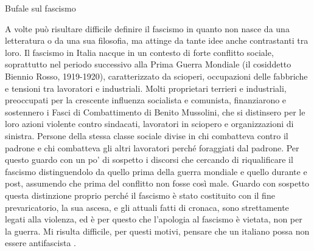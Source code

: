 \documentclass[12pt]{book} %
\begin{document}
\begin{mdframed}[linewidth=1pt]
Bufale sul fascismo

A volte può risultare difficile definire il fascismo in quanto non nasce da una letteratura o da una sua filosofia, ma attinge da tante idee anche contrastanti tra loro. 
Il fascismo in Italia nacque in un contesto di forte conflitto sociale, soprattutto nel periodo successivo alla Prima Guerra Mondiale (il cosiddetto Biennio Rosso, 1919-1920), caratterizzato da scioperi, occupazioni delle fabbriche e tensioni tra lavoratori e industriali.
Molti proprietari terrieri e industriali, preoccupati per la crescente influenza socialista e comunista, finanziarono e sostennero i Fasci di Combattimento di Benito Mussolini, che si distinsero per le loro azioni violente contro sindacati, lavoratori in sciopero e organizzazioni di sinistra. Persone della stessa classe sociale divise in chi combatteva contro il padrone e chi combatteva gli altri lavoratori perché foraggiati dal padrone.
Per questo guardo con un po' di sospetto i discorsi che cercando di riqualificare il fascismo distinguendolo da quello prima della guerra mondiale e quello durante e post, assumendo che prima del conflitto non fosse così male. Guardo con sospetto questa distinzione proprio perché il fascismo è stato costituito con il fine prevaricatorio, la sua ascesa, e gli attuali fatti di cronaca, sono strettamente legati alla violenza, ed è per questo che l'apologia al fascismo è vietata, non per la guerra. Mi risulta difficile, per questi motivi, pensare che un italiano possa non essere antifascista .


\end{mdframed}
\end{document}
